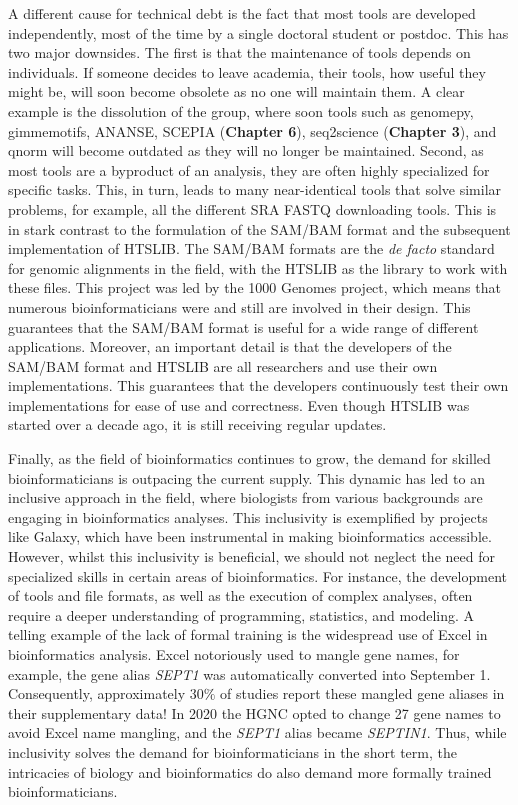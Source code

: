A different cause for technical debt is the fact that most tools are developed independently, most of the time by a single doctoral student or postdoc. This has two major downsides. The first is that the maintenance of tools depends on individuals. If someone decides to leave academia, their tools, how useful they might be, will soon become obsolete as no one will maintain them. A clear example is the dissolution of the  group, where soon tools such as genomepy\cite{Frlich2023}, gimmemotifs\cite{Bruse_2018}, ANANSE\cite{Xu_2020}, SCEPIA (\textbf{Chapter 6}), seq2science\cite{seq2science} (\textbf{Chapter 3}), and qnorm\cite{qnorm} will become outdated as they will no longer be maintained. Second, as most tools are a byproduct of an analysis, they are often highly specialized for specific tasks. This, in turn, leads to many near-identical tools that solve similar problems, for example, all the different SRA FASTQ downloading tools. This is in stark contrast to the formulation of the SAM/BAM format\cite{Li2009} and the subsequent implementation of HTSLIB\cite{Bonfield2021}. The SAM/BAM formats are the \textit{de facto} standard for genomic alignments in the field, with the HTSLIB as the library to work with these files. This project was led by the 1000 Genomes project, which means that numerous bioinformaticians were and still are involved in their design. This guarantees that the SAM/BAM format is useful for a wide range of different applications. Moreover, an important detail is that the developers of the SAM/BAM format and HTSLIB are all researchers and use their own implementations. This guarantees that the developers continuously test their own implementations for ease of use and correctness. Even though HTSLIB was started over a decade ago, it is still receiving regular updates. 

Finally, as the field of bioinformatics continues to grow, the demand for skilled bioinformaticians is outpacing the current supply. This dynamic has led to an inclusive approach in the field, where biologists from various backgrounds are engaging in bioinformatics analyses. This inclusivity is exemplified by projects like Galaxy\cite{galaxy}, which have been instrumental in making bioinformatics accessible. However, whilst this inclusivity is beneficial, we should not neglect the need for specialized skills in certain areas of bioinformatics. For instance, the development of tools and file formats, as well as the execution of complex analyses, often require a deeper understanding of programming, statistics, and modeling. A telling example of the lack of formal training is the widespread use of Excel in bioinformatics analysis. Excel notoriously used to mangle gene names\cite{Zeeberg2004}, for example, the gene alias \textit{SEPT1} was automatically converted into September 1. Consequently, approximately $30\%$ of studies report these mangled gene aliases in their supplementary data\cite{Abeysooriya2021}! In 2020 the HGNC opted to change 27 gene names to avoid Excel name mangling, and the \textit{SEPT1} alias became \textit{SEPTIN1}. Thus, while inclusivity solves the demand for bioinformaticians in the short term, the intricacies of biology and bioinformatics do also demand more formally trained bioinformaticians.

